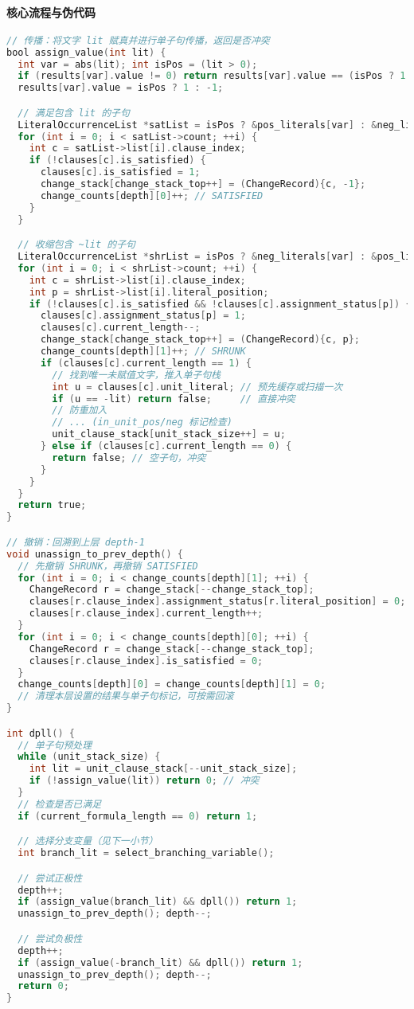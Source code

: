\documentclass[UTF8]{ctexart}
\begin{document}
\paragraph{核心流程与伪代码}
\begin{lstlisting}[language=C]
// 传播：将文字 lit 赋真并进行单子句传播，返回是否冲突
bool assign_value(int lit) {
  int var = abs(lit); int isPos = (lit > 0);
  if (results[var].value != 0) return results[var].value == (isPos ? 1 : -1);
  results[var].value = isPos ? 1 : -1;

  // 满足包含 lit 的子句
  LiteralOccurrenceList *satList = isPos ? &pos_literals[var] : &neg_literals[var];
  for (int i = 0; i < satList->count; ++i) {
    int c = satList->list[i].clause_index;
    if (!clauses[c].is_satisfied) {
      clauses[c].is_satisfied = 1;
      change_stack[change_stack_top++] = (ChangeRecord){c, -1};
      change_counts[depth][0]++; // SATISFIED
    }
  }

  // 收缩包含 ~lit 的子句
  LiteralOccurrenceList *shrList = isPos ? &neg_literals[var] : &pos_literals[var];
  for (int i = 0; i < shrList->count; ++i) {
    int c = shrList->list[i].clause_index;
    int p = shrList->list[i].literal_position;
    if (!clauses[c].is_satisfied && !clauses[c].assignment_status[p]) {
      clauses[c].assignment_status[p] = 1;
      clauses[c].current_length--;
      change_stack[change_stack_top++] = (ChangeRecord){c, p};
      change_counts[depth][1]++; // SHRUNK
      if (clauses[c].current_length == 1) {
        // 找到唯一未赋值文字，推入单子句栈
        int u = clauses[c].unit_literal; // 预先缓存或扫描一次
        if (u == -lit) return false;     // 直接冲突
        // 防重加入
        // ... (in_unit_pos/neg 标记检查)
        unit_clause_stack[unit_stack_size++] = u;
      } else if (clauses[c].current_length == 0) {
        return false; // 空子句，冲突
      }
    }
  }
  return true;
}

// 撤销：回溯到上层 depth-1
void unassign_to_prev_depth() {
  // 先撤销 SHRUNK，再撤销 SATISFIED
  for (int i = 0; i < change_counts[depth][1]; ++i) {
    ChangeRecord r = change_stack[--change_stack_top];
    clauses[r.clause_index].assignment_status[r.literal_position] = 0;
    clauses[r.clause_index].current_length++;
  }
  for (int i = 0; i < change_counts[depth][0]; ++i) {
    ChangeRecord r = change_stack[--change_stack_top];
    clauses[r.clause_index].is_satisfied = 0;
  }
  change_counts[depth][0] = change_counts[depth][1] = 0;
  // 清理本层设置的结果与单子句标记，可按需回滚
}

int dpll() {
  // 单子句预处理
  while (unit_stack_size) {
    int lit = unit_clause_stack[--unit_stack_size];
    if (!assign_value(lit)) return 0; // 冲突
  }
  // 检查是否已满足
  if (current_formula_length == 0) return 1;

  // 选择分支变量（见下一小节）
  int branch_lit = select_branching_variable();

  // 尝试正极性
  depth++;
  if (assign_value(branch_lit) && dpll()) return 1;
  unassign_to_prev_depth(); depth--;

  // 尝试负极性
  depth++;
  if (assign_value(-branch_lit) && dpll()) return 1;
  unassign_to_prev_depth(); depth--;
  return 0;
}
\end{lstlisting}
\end{document}
